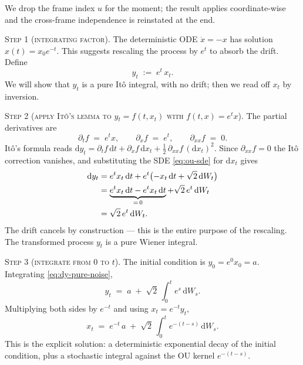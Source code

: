 \documentclass[11pt]{article}
\theoremstyle{definition}
\begin{document}
\begin{derivation}
We drop the frame index \(u\) for the moment; the result applies
coordinate-wise and the cross-frame independence is reinstated at the end.

\medskip\noindent
\textsc{Step 1 (integrating factor).}
The deterministic ODE \(\dot x = -x\) has solution \(x(t) = x_0 e^{-t}\).
This suggests rescaling the process by \(e^t\) to absorb the drift.
Define
\begin{equation}
    y_t \;:=\; e^{t}\, x_t.
\end{equation}
We will show that \(y_t\) is a pure It\^o integral, with no drift; then we
read off \(x_t\) by inversion.

\medskip\noindent
\textsc{Step 2 (apply It\^o's lemma to \(y_t = f(t, x_t)\) with
\(f(t, x) = e^t x\)).}
The partial derivatives are
\begin{equation}
    \partial_t f \;=\; e^t x,
    \qquad
    \partial_x f \;=\; e^t,
    \qquad
    \partial_{xx} f \;=\; 0.
\end{equation}
It\^o's formula reads
\(\mathrm d y_t = \partial_t f\, \mathrm d t
   + \partial_x f\, \mathrm d x_t
   + \tfrac{1}{2}\, \partial_{xx} f\, (\mathrm d x_t)^2\).
Since \(\partial_{xx} f = 0\) the It\^o correction vanishes, and substituting
the SDE \eqref{eq:ou-sde} for \(\mathrm d x_t\) gives
\begin{align}
    \mathrm d y_t
        &= e^{t} x_t\, \mathrm d t
            + e^{t}\bigl(-x_t\, \mathrm d t + \sqrt{2}\, \mathrm d W_t\bigr)
            \notag \\
        &= \underbrace{e^t x_t\, \mathrm d t - e^t x_t\, \mathrm d t}_{=\,0}
            + \sqrt{2}\, e^{t}\, \mathrm d W_t
            \notag \\
        &= \sqrt{2}\, e^{t}\, \mathrm d W_t.
        \label{eq:dy-pure-noise}
\end{align}
The drift cancels by construction --- this is the entire purpose of the
rescaling. The transformed process \(y_t\) is a pure Wiener integral.

\medskip\noindent
\textsc{Step 3 (integrate from \(0\) to \(t\)).}
The initial condition is \(y_0 = e^{0} x_0 = a\). Integrating
\eqref{eq:dy-pure-noise},
\begin{equation}\label{eq:yt-integrated}
    y_t \;=\; a \;+\; \sqrt{2}\, \int_{0}^{t} e^{s}\, \mathrm d W_s.
\end{equation}
Multiplying both sides by \(e^{-t}\) and using \(x_t = e^{-t} y_t\),
\begin{equation}\label{eq:xt-explicit}
    x_t \;=\; e^{-t}\, a
    \;+\; \sqrt{2}\, \int_{0}^{t} e^{-(t - s)}\, \mathrm d W_s.
\end{equation}
This is the explicit solution: a deterministic exponential decay of the
initial condition, plus a stochastic integral against the OU kernel
\(e^{-(t - s)}\).


\end{derivation}
\end{document}
